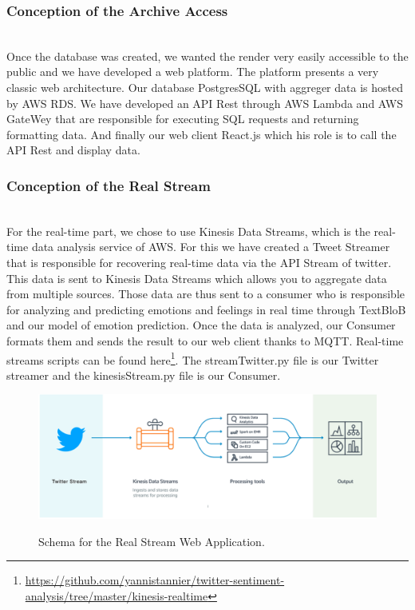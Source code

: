 \documentclass{acmtog} %
\begin{document}
\subsubsection{Conception of the Archive Access}
\label{subsub:conception_aa}

~\\Once the database was created, we wanted the render very easily accessible to the public and we have developed a web platform.
The platform presents a very classic web architecture. Our database PostgresSQL with aggreger data is hosted by AWS RDS.
We have developed an API Rest through AWS Lambda and AWS GateWey that are responsible for executing SQL requests and returning formatting data.
And finally our web client React.js which his role is to call the API Rest and display data.

\subsubsection{Conception of the Real Stream}
\label{subsub:conception_rs}

~\\For the real-time part, we chose to use Kinesis Data Streams, which is the real-time data analysis service of AWS.
For this we have created a Tweet Streamer that is responsible for recovering real-time data via the API Stream of twitter. This data is sent to Kinesis Data Streams which allows you to aggregate data from multiple sources.
Those data are thus sent to a consumer who is responsible for analyzing and predicting emotions and feelings in real time through TextBloB and our model of emotion prediction.
Once the data is analyzed, our Consumer formats them and sends the result to our web client thanks to MQTT.
Real-time streams scripts can be found here\footnote{\url{https://github.com/yannistannier/twitter-sentiment-analysis/tree/master/kinesis-realtime}}.
The streamTwitter.py file is our Twitter streamer and the kinesisStream.py file is our Consumer.


\begin{figure}[H]
{\includegraphics[width=\linewidth]{real_stream-schema.png}}
\caption{Schema for the Real Stream Web Application.}
  \label{fig:archivers}
\end{figure}
\end{document}
